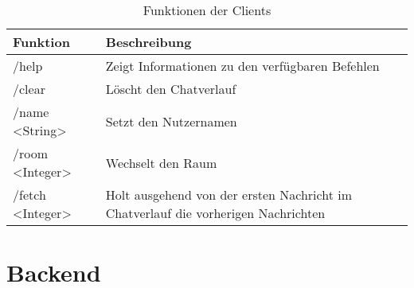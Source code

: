 \begin{table}[h!]
\begin{center}
\begin{tabular}{ | l | m{10cm} | }
\hline
\textbf{Funktion} & \textbf{Beschreibung} \\ 
\hline
/help & Zeigt Informationen zu den verfügbaren Befehlen \\ 
\hline
/clear & Löscht den Chatverlauf \\ 
\hline
/name <String> & Setzt den Nutzernamen \\ 
\hline
/room <Integer> & Wechselt den Raum \\ 
\hline
/fetch <Integer> & Holt ausgehend von der ersten Nachricht im Chatverlauf die vorherigen Nachrichten \\ 
\hline
\end{tabular}
\end{center}
\caption{Funktionen der Clients}
\label{tab:clientcommands}
\end{table}

\section{Backend}
